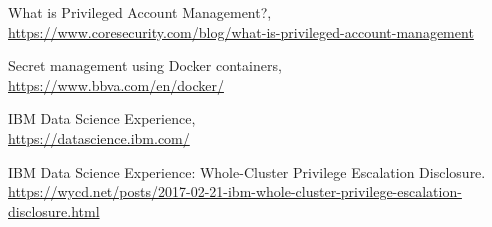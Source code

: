 \documentclass[a4paper,12pt]{article}
\begin{document}
\begin{thebibliography}{99}
What is Privileged Account Management?, \\ \url{https://www.coresecurity.com/blog/what-is-privileged-account-management}

Secret management using Docker containers, \\ \url{https://www.bbva.com/en/docker/}

IBM Data Science Experience, \\ \url{https://datascience.ibm.com/}

IBM Data Science Experience: Whole-Cluster Privilege Escalation Disclosure. \\ \url{https://wycd.net/posts/2017-02-21-ibm-whole-cluster-privilege-escalation-disclosure.html}



\end{thebibliography}
\end{document}
